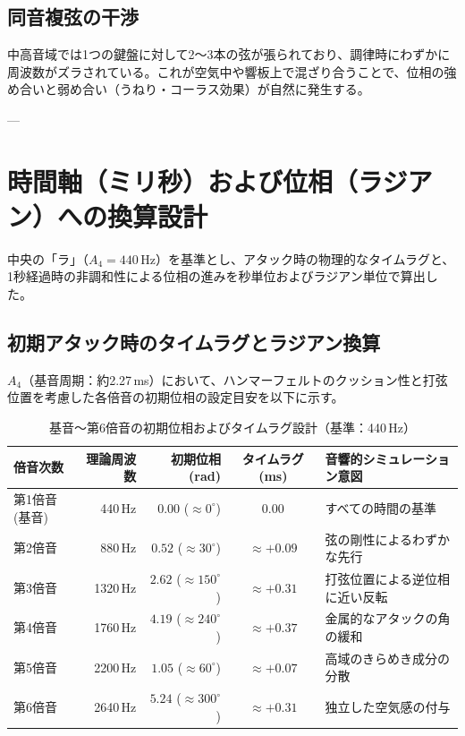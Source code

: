 \documentclass[uplatex,dvipdfmx]{jlreq}
\begin{document}
\subsection{同音複弦の干渉}
中高音域では1つの鍵盤に対して2〜3本の弦が張られており、調律時にわずかに周波数がズラされている。これが空気中や響板上で混ざり合うことで、位相の強め合いと弱め合い（うねり・コーラス効果）が自然に発生する。

---

\section{時間軸（ミリ秒）および位相（ラジアン）への換算設計}
中央の「ラ」（$A_4 = 440\,\text{Hz}$）を基準とし、アタック時の物理的なタイムラグと、1秒経過時の非調和性による位相の進みを秒単位およびラジアン単位で算出した。

\subsection{初期アタック時のタイムラグとラジアン換算}
$A_4$（基音周期：約2.27\,ms）において、ハンマーフェルトのクッション性と打弦位置を考慮した各倍音の初期位相の設定目安を以下に示す。

\begin{table}[h]
\centering
\caption{基音〜第6倍音の初期位相およびタイムラグ設計（基準：440\,Hz）}
\begin{tabular}{lrrcl}
\toprule
倍音次数 & 理論周波数 & 初期位相 (rad) & タイムラグ (ms) & 音響的シミュレーション意図 \\
\midrule
第1倍音 (基音) & 440\,Hz  & $0.00$ ($\approx 0^\circ$)   & $0.00$ & すべての時間の基準 \\
第2倍音        & 880\,Hz  & $0.52$ ($\approx 30^\circ$)  & $\approx +0.09$ & 弦の剛性によるわずかな先行 \\
第3倍音        & 1320\,Hz & $2.62$ ($\approx 150^\circ$) & $\approx +0.31$ & 打弦位置による逆位相に近い反転 \\
第4倍音        & 1760\,Hz & $4.19$ ($\approx 240^\circ$) & $\approx +0.37$ & 金属的なアタックの角の緩和 \\
第5倍音        & 2200\,Hz & $1.05$ ($\approx 60^\circ$)  & $\approx +0.07$ & 高域のきらめき成分の分散 \\
第6倍音        & 2640\,Hz & $5.24$ ($\approx 300^\circ$) & $\approx +0.31$ & 独立した空気感の付与 \\
\bottomrule
\end{tabular}
\end{table}
\end{document}
